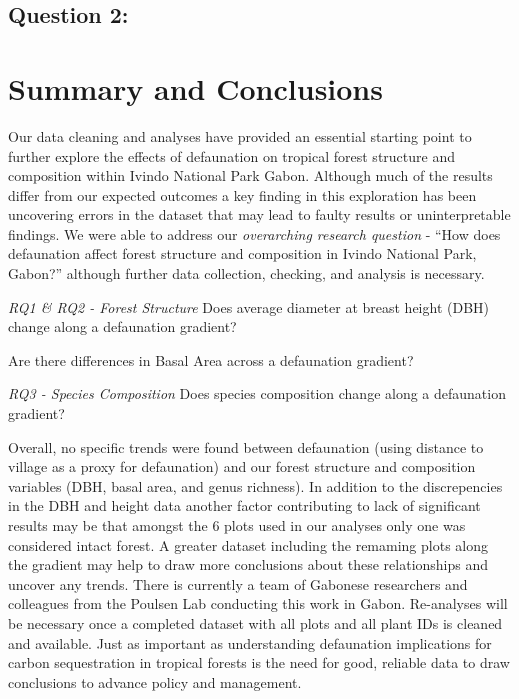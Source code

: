 \documentclass[
  12pt,
]{article}
\begin{document}
\hypertarget{question-2}{%
\subsection{Question 2:}\label{question-2}}

\newpage

\hypertarget{summary-and-conclusions}{%
\section{Summary and Conclusions}\label{summary-and-conclusions}}

Our data cleaning and analyses have provided an essential starting point
to further explore the effects of defaunation on tropical forest
structure and composition within Ivindo National Park Gabon. Although
much of the results differ from our expected outcomes a key finding in
this exploration has been uncovering errors in the dataset that may lead
to faulty results or uninterpretable findings. We were able to address
our \emph{overarching research question} - ``How does defaunation affect
forest structure and composition in Ivindo National Park, Gabon?''
although further data collection, checking, and analysis is necessary.

\emph{RQ1 \& RQ2 - Forest Structure} Does average diameter at breast
height (DBH) change along a defaunation gradient?

Are there differences in Basal Area across a defaunation gradient?

\emph{RQ3 - Species Composition} Does species composition change along a
defaunation gradient?

Overall, no specific trends were found between defaunation (using
distance to village as a proxy for defaunation) and our forest structure
and composition variables (DBH, basal area, and genus richness). In
addition to the discrepencies in the DBH and height data another factor
contributing to lack of significant results may be that amongst the 6
plots used in our analyses only one was considered intact forest. A
greater dataset including the remaming plots along the gradient may help
to draw more conclusions about these relationships and uncover any
trends. There is currently a team of Gabonese researchers and colleagues
from the Poulsen Lab conducting this work in Gabon. Re-analyses will be
necessary once a completed dataset with all plots and all plant IDs is
cleaned and available. Just as important as understanding defaunation
implications for carbon sequestration in tropical forests is the need
for good, reliable data to draw conclusions to advance policy and
management.
\end{document}
